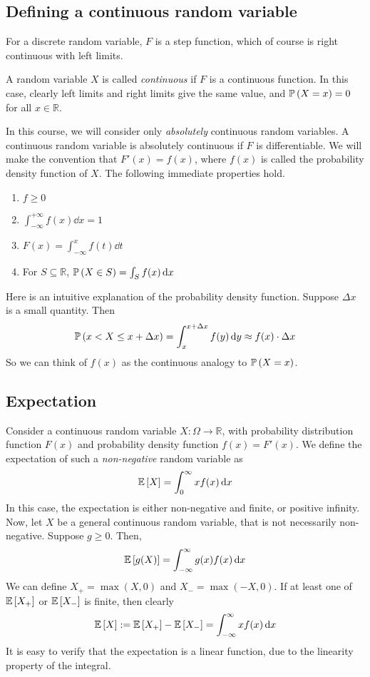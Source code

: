 \subsection{Defining a continuous random variable}
For a discrete random variable, \(F\) is a step function, which of course is right continuous with left limits.
\begin{definition}
	A random variable \(X\) is called \textit{continuous} if \(F\) is a continuous function.
	In this case, clearly left limits and right limits give the same value, and \(\mathbb{P}\left({X = x}\right) = 0\) for all \(x \in\mathbb R\).
\end{definition}
In this course, we will consider only \textit{absolutely} continuous random variables.
A continuous random variable is absolutely continuous if \(F\) is differentiable.
We will make the convention that \(F'(x) = f(x)\), where \(f(x)\) is called the probability density function of \(X\).
The following immediate properties hold.
\begin{enumerate}
	\item \(f \geq 0\)
	\item \(\int_{-\infty}^{+\infty} f(x) \dd{x} = 1\)
	\item \(F(x) = \int_{-\infty}^x f(t) \dd{t}\)
	\item For \(S \subseteq \mathbb R\), \(\mathbb{P}\left({X \in S}\right) = \int_S f(x) \dd{x}\)
\end{enumerate}
Here is an intuitive explanation of the probability density function.
Suppose \(\Delta x\) is a small quantity.
Then
\[
	\mathbb{P}\left({x < X \leq x + \Delta x}\right) = \int_x^{x + \Delta x} f(y) \dd{y} \approx f(x) \cdot \Delta x
\]
So we can think of \(f(x)\) as the continuous analogy to \(\mathbb{P}\left({X = x}\right)\).

\subsection{Expectation}
Consider a continuous random variable \(X \colon \Omega \to \mathbb R\), with probability distribution function \(F(x)\) and probability density function \(f(x) = F'(x)\).
We define the expectation of such a \textit{non-negative} random variable as
\[
	\mathbb{E}\left[{X}\right] = \int_0^\infty x f(x) \dd{x}
\]
In this case, the expectation is either non-negative and finite, or positive infinity.
Now, let \(X\) be a general continuous random variable, that is not necessarily non-negative.
Suppose \(g \geq 0\).
Then,
\[
	\mathbb{E}\left[{g(X)}\right] = \int_{-\infty}^\infty g(x) f(x) \dd{x}
\]
We can define \(X_+ = \max(X, 0)\) and \(X_- = \max(-X, 0)\).
If at least one of \(\mathbb{E}\left[{X_+}\right]\) or \(\mathbb{E}\left[{X_-}\right]\) is finite, then clearly
\[
	\mathbb{E}\left[{X}\right] := \mathbb{E}\left[{X_+}\right] - \mathbb{E}\left[{X_-}\right] = \int_{-\infty}^\infty xf(x) \dd{x}
\]
It is easy to verify that the expectation is a linear function, due to the linearity property of the integral.


